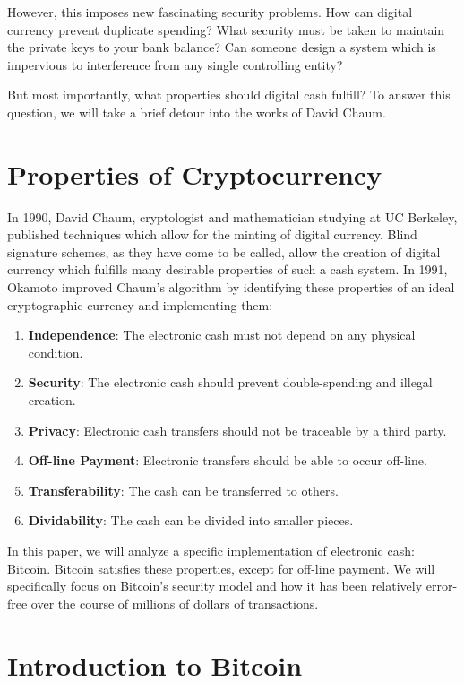 \documentclass{report}
\begin{document}
However, this imposes new fascinating security problems. How can digital
currency prevent duplicate spending? What security must be taken to maintain the
private keys to your bank balance? Can someone design a system which is
impervious to interference from any single controlling entity?

But most importantly, what properties should digital cash fulfill? To answer
this question, we will take a brief detour into the works of David Chaum.

\section*{Properties of Cryptocurrency}
In 1990, David Chaum, cryptologist and mathematician studying at UC Berkeley,
published techniques which allow for the minting of digital
currency.\cite{Chaum:Cash} Blind signature schemes, as they have come to be
called, allow the creation of digital currency which fulfills many desirable
properties of such a cash system. In 1991, Okamoto improved Chaum's algorithm
by identifying these properties of an ideal cryptographic currency and
implementing them:\cite{Okamoto:Cash}

\begin{enumerate}
\item \textbf{Independence}: The electronic cash must not depend on any physical condition.
\item \textbf{Security}: The electronic cash should prevent double-spending and illegal creation.
\item \textbf{Privacy}: Electronic cash transfers should not be traceable by a third party.
\item \textbf{Off-line Payment}: Electronic transfers should be able to occur off-line.
\item \textbf{Transferability}: The cash can be transferred to others.
\item \textbf{Dividability}: The cash can be divided into smaller pieces.
\end{enumerate}

In this paper, we will analyze a specific implementation of electronic cash:
Bitcoin. Bitcoin satisfies these properties, except for off-line payment. We
will specifically focus on Bitcoin's security model and how it has been
relatively error-free over the course of millions of dollars of transactions.

\section*{Introduction to Bitcoin}
\end{document}
